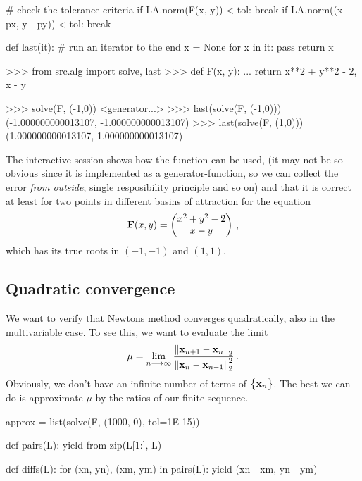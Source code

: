 \documentclass[12pt]{article}
\begin{document}
\begin{multicols}{2}
\begin{python}[caption={Newton's method}]
        # check the tolerance criteria
        if LA.norm(F(x, y)) < tol:
            break
        if LA.norm((x - px, y - py)) < tol:
            break

def last(it):
    # run an iterator to the end
    x = None
    for x in it: pass
    return x
    \end{python}
    \vspace{-0.5\baselineskip}
    \begin{python}[frame=b,numbers=none]
>>> from src.alg import solve, last
>>> def F(x, y):
...     return x**2 + y**2 - 2, x - y

>>> solve(F, (-1,0))
<generator...>
>>> last(solve(F, (-1,0)))
(-1.000000000013107, -1.000000000013107)
>>> last(solve(F, (1,0)))
(1.000000000013107, 1.000000000013107)
    \end{python}
    The interactive session shows how the function can be used,
    (it may not be so obvious since it is implemented
    as a generator-function, so we can collect the error {\em from outside};
    single resposibility principle and so on)
    and that it is correct at least for two points in different
    basins of attraction for the equation
    \[
        \vec F(x, y) = \begin{pmatrix}
            x^2 + y^2 - 2 \\
            x - y
        \end{pmatrix} \,\text,
    \]
    which has its true roots in $(-1, -1)$ and $(1, 1)$.

    \subsection*{Quadratic convergence}
    We want to verify that Newtons method converges quadratically,
    also in the multivariable case.
    To see this, we want to evaluate the limit
    \[
        \mu = \lim_{n \longrightarrow \infty}
            \frac{\Norm[2]{\vec x_{n+1} - \vec x_n}}
                 {\Norm[2]{\vec x_n - \vec x_{n-1}}^2}
        \,\text.
    \]
    Obviously, we don't have an infinite number of terms of $\Seq{\vec x_n}$.
    The best we can do is approximate $\mu$ by the ratios of our finite sequence.
    \begin{python}[
        caption={Computing the sequence of ratios}
    ]
approx = list(solve(F, (1000, 0), tol=1E-15))

def pairs(L):
    yield from zip(L[1:], L)

def diffs(L):
    for (xn, yn), (xm, ym) in pairs(L):
        yield (xn - xm, yn - ym)


\end{python}
\end{multicols}
\end{document}

